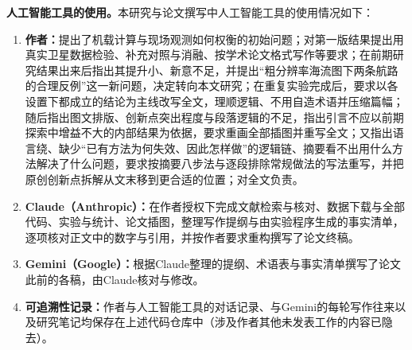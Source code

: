 \textbf{人工智能工具的使用。}本研究与论文撰写中人工智能工具的使用情况如下：
\begin{enumerate}
    \item \textbf{作者：}提出了机载计算与现场观测如何权衡的初始问题；对第一版结果提出用真实卫星数据检验、补充对照与消融、按学术论文格式写作等要求；在前期研究结果出来后指出其提升小、新意不足，并提出“粗分辨率海流图下两条航路的合理反例”这一新问题，决定转向本文研究；在重复实验完成后，要求以各设置下都成立的结论为主线改写全文，理顺逻辑、不用自造术语并压缩篇幅；随后指出图文排版、创新点突出程度与段落逻辑的不足，指出引言不应以前期探索中增益不大的内部结果为依据，要求重画全部插图并重写全文；又指出语言绕、缺少“已有方法为何失效、因此怎样做”的逻辑链、摘要看不出用什么方法解决了什么问题，要求按摘要八步法与逐段排除常规做法的写法重写，并把原创创新点拆解从文末移到更合适的位置；对全文负责。
    \item \textbf{Claude（Anthropic）：}在作者授权下完成文献检索与核对、数据下载与全部代码、实验与统计、论文插图，整理写作提纲与由实验程序生成的事实清单，逐项核对正文中的数字与引用，并按作者要求重构撰写了论文终稿。
    \item \textbf{Gemini（Google）：}根据Claude整理的提纲、术语表与事实清单撰写了论文此前的各稿，由Claude核对与修改。
    \item \textbf{可追溯性记录：}作者与人工智能工具的对话记录、与Gemini的每轮写作往来以及研究笔记均保存在上述代码仓库中（涉及作者其他未发表工作的内容已隐去）。
\end{enumerate}
